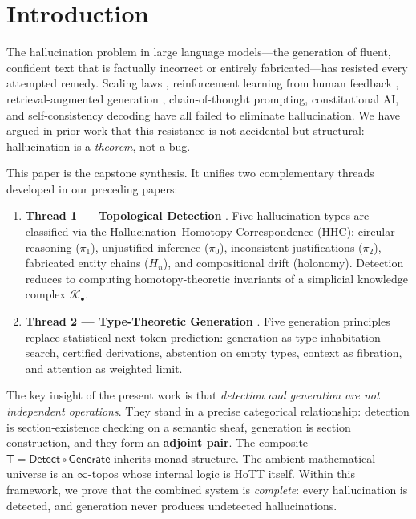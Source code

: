 \documentclass[11pt,a4paper]{article}
\theoremstyle{plain}
\theoremstyle{definition}
\theoremstyle{remark}
\newcommand{\Detect}{\mathsf{Detect}}
\newcommand{\Generate}{\mathsf{Generate}}
\newcommand{\SemanticT}{\mathsf{T}}
\begin{document}
\section{Introduction}\label{sec:intro}

The hallucination problem in large language models---the generation of fluent, confident text that is factually incorrect or entirely fabricated---has resisted every attempted remedy. Scaling laws \cite{openai2023gpt4}, reinforcement learning from human feedback \cite{ouyang2022training}, retrieval-augmented generation \cite{lewis2020retrieval}, chain-of-thought prompting, constitutional AI, and self-consistency decoding have all failed to eliminate hallucination. We have argued in prior work \cite{long2026homotopical,long2026hhc} that this resistance is not accidental but structural: hallucination is a \emph{theorem}, not a bug.

This paper is the capstone synthesis. It unifies two complementary threads developed in our preceding papers:

\begin{enumerate}[leftmargin=*]
\item \textbf{Thread 1 --- Topological Detection} \cite{long2026hhc}. Five hallucination types are classified via the Hallucination--Homotopy Correspondence (HHC): circular reasoning ($\pi_1$), unjustified inference ($\pi_0$), inconsistent justifications ($\pi_2$), fabricated entity chains ($H_n$), and compositional drift (holonomy). Detection reduces to computing homotopy-theoretic invariants of a simplicial knowledge complex $\mathcal{K}_\bullet$.

\item \textbf{Thread 2 --- Type-Theoretic Generation} \cite{long2026homotopical}. Five generation principles replace statistical next-token prediction: generation as type inhabitation search, certified derivations, abstention on empty types, context as fibration, and attention as weighted limit.
\end{enumerate}

The key insight of the present work is that \emph{detection and generation are not independent operations}. They stand in a precise categorical relationship: detection is section-existence checking on a semantic sheaf, generation is section construction, and they form an \textbf{adjoint pair}. The composite $\SemanticT = \Detect \circ \Generate$ inherits monad structure. The ambient mathematical universe is an $\infty$-topos whose internal logic is HoTT itself. Within this framework, we prove that the combined system is \emph{complete}: every hallucination is detected, and generation never produces undetected hallucinations.
\end{document}
